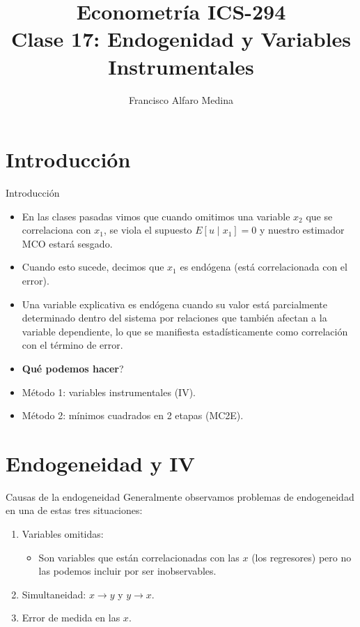 \documentclass[10pt]{beamer}
\title[ICS-162]{Econometr\'ia ICS-294\\ \small{Clase 17: Endogenidad y Variables Instrumentales}}
\author{Francisco Alfaro Medina}
\institute[USM]
{Universidad T\'ecnica Federico Santa Mar\'ia\\ %
    \medskip
    \textit{} %
    }
\date{}
\begin{document}
\begin{frame}
    \titlepage %
\end{frame}

\section{Introducci\'on}

\begin{frame}{Introducci\'on}
    \begin{itemize}
        \item En las clases pasadas vimos que cuando omitimos una variable $x_{2}$ que se correlaciona con $x_{1}$, se viola el supuesto $E\left[u \mid x_{1}\right]=0$ y nuestro estimador MCO estar\'a sesgado.
        \item Cuando esto sucede, decimos que $x_{1}$ es {\color{blue}end\'ogena (est\'a correlacionada con el error)}.
        \item {\color{blue}Una variable explicativa es endógena cuando su valor está parcialmente determinado dentro del sistema por relaciones que también afectan a la variable dependiente, lo que se manifiesta estadísticamente como correlación con el término de error. }
        \item \textbf{\textquestiondown Qu\'e podemos hacer}?
        \item M\'etodo 1: variables instrumentales (IV).
        \item  M\'etodo 2: mínimos cuadrados en 2 etapas (MC2E).
    \end{itemize}
\end{frame}

\section{Endogeneidad y IV}

\begin{frame}{Causas de la endogeneidad}
    Generalmente observamos problemas de endogeneidad en una de estas tres situaciones:
    \begin{enumerate}
        \item Variables omitidas:
        \begin{itemize}
            \item Son variables que est\'an correlacionadas con las $x$ (los regresores) pero no las podemos incluir por ser inobservables.
        \end{itemize}
        \item Simultaneidad: $x \rightarrow y$ y $y \rightarrow x$.
        \item Error de medida en las $x$.
    \end{enumerate}
\end{frame}
\end{document}
